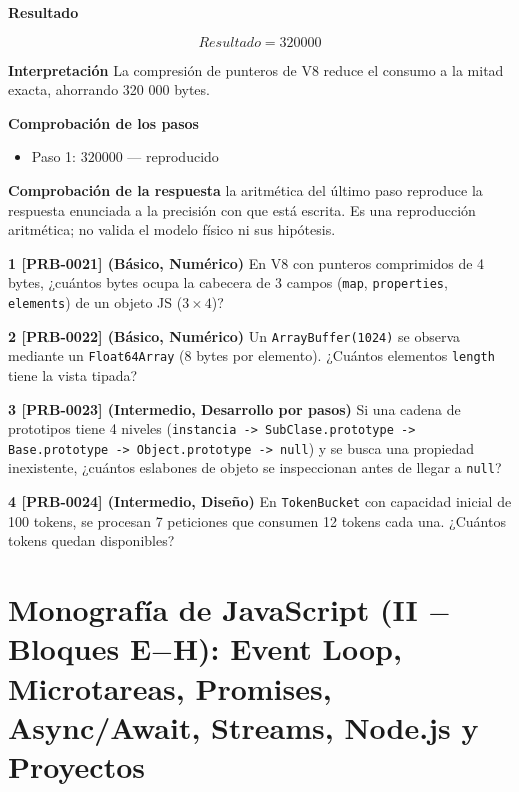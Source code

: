 \documentclass{book}
\begin{document}
\begin{tcolorbox}[title={Problema resuelto}, studiumworked, breakable]
\noindent\textbf{Resultado}

\[
Resultado = 320000
\]

\noindent\textbf{Interpretación}
La compresión de punteros de V8 reduce el consumo a la mitad exacta, ahorrando 320 000 bytes.

\noindent\textbf{Comprobación de los pasos}
\begin{itemize}
\item Paso 1: $320000$ — reproducido
\end{itemize}

\noindent\textbf{Comprobación de la respuesta} la aritmética del último paso reproduce la respuesta enunciada a la precisión con que está escrita. Es una reproducción aritmética; no valida el modelo físico ni sus hipótesis.
\end{tcolorbox}

\begin{tcolorbox}[title={Ejercicios}, studiumworked, breakable]

\noindent\textbf{1 [PRB-0021] (Básico, Numérico)}
En V8 con punteros comprimidos de 4 bytes, ¿cuántos bytes ocupa la cabecera de 3 campos (\texttt{map}, \texttt{properties}, \texttt{elements}) de un objeto JS (\(3 \times 4\))?

\noindent\textbf{2 [PRB-0022] (Básico, Numérico)}
Un \texttt{ArrayBuffer(1024)} se observa mediante un \texttt{Float64Array} (8 bytes por elemento). ¿Cuántos elementos \texttt{length} tiene la vista tipada?

\noindent\textbf{3 [PRB-0023] (Intermedio, Desarrollo por pasos)}
Si una cadena de prototipos tiene 4 niveles (\texttt{instancia -> SubClase.prototype -> Base.prototype -> Object.prototype -> null}) y se busca una propiedad inexistente, ¿cuántos eslabones de objeto se inspeccionan antes de llegar a \texttt{null}?

\noindent\textbf{4 [PRB-0024] (Intermedio, Diseño)}
En \texttt{TokenBucket} con capacidad inicial de 100 tokens, se procesan 7 peticiones que consumen 12 tokens cada una. ¿Cuántos tokens quedan disponibles?
\end{tcolorbox}

\chapter{Monografía de JavaScript (II \(-\) Bloques E\(-\)H): Event Loop, Microtareas, Promises, Async/Await, Streams, Node.js y Proyectos}
\label{chap:cap05-javascript-avanzado-event-loop-promesas-web-node-proyectos}
\end{document}
